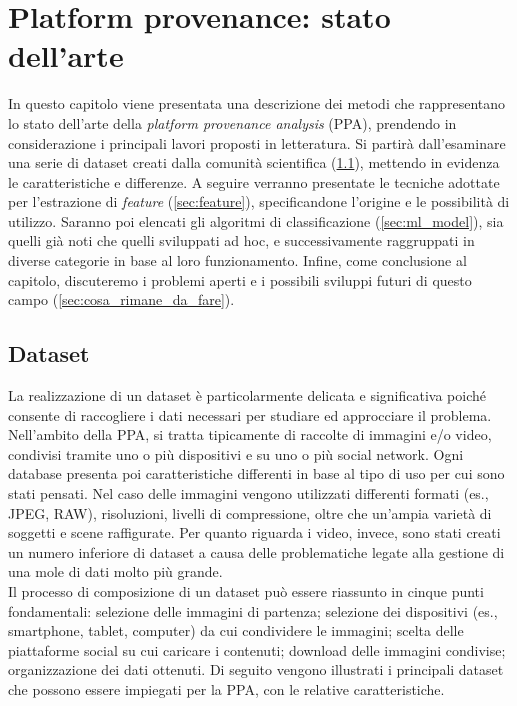 \chapter{Platform provenance: stato dell'arte}
\label{cha:ppa}
In questo capitolo viene presentata una descrizione dei metodi che rappresentano lo stato dell'arte della \textit{platform provenance analysis} (PPA), prendendo in considerazione i principali lavori proposti in letteratura. Si partirà dall'esaminare una serie di dataset creati dalla comunità scientifica (\ref{sec:dataset}), mettendo in evidenza le caratteristiche e differenze. A seguire verranno presentate le tecniche adottate per l'estrazione di \textit{feature} (\ref{sec:feature}), specificandone l'origine e le possibilità di utilizzo. Saranno poi elencati gli algoritmi di classificazione (\ref{sec:ml_model}), sia quelli già noti che quelli sviluppati ad hoc, e successivamente raggruppati in diverse categorie in base al loro funzionamento. Infine, come conclusione al capitolo, discuteremo i problemi aperti e i possibili sviluppi futuri di questo campo (\ref{sec:cosa_rimane_da_fare}).

\section{Dataset}
\label{sec:dataset}
La realizzazione di un dataset è particolarmente delicata e significativa poiché consente di raccogliere i dati necessari per studiare ed approcciare il problema. Nell'ambito della PPA, si tratta tipicamente di raccolte di immagini e/o video, condivisi tramite uno o più dispositivi e su uno o più social network. Ogni database presenta poi caratteristiche differenti in base al tipo di uso per cui sono stati pensati. Nel caso delle immagini vengono utilizzati differenti formati (es., JPEG, RAW), risoluzioni, livelli di compressione, oltre che un'ampia varietà di soggetti e scene raffigurate. Per quanto riguarda i video, invece, sono stati creati un numero inferiore di dataset a causa delle problematiche legate alla gestione di una mole di dati molto più grande.\\
Il processo di composizione di un dataset può essere riassunto in cinque punti fondamentali: selezione delle immagini di partenza; selezione dei dispositivi (es., smartphone, tablet, computer) da cui condividere le immagini; scelta delle piattaforme social su cui caricare i contenuti; download delle immagini condivise; organizzazione dei dati ottenuti. Di seguito vengono illustrati i principali dataset che possono essere impiegati per la PPA, con le relative caratteristiche.

